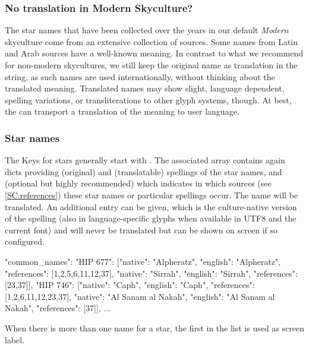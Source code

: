 \subsubsection{No translation in Modern Skyculture?}

The star names that have been collected over the years in our default \emph{Modern} skyculture come from an extensive collection of sources.
Some names from Latin and Arab sources have a well-known meaning.  
In contrast to what we recommend for non-modern skycultures, we still keep the original name as translation in the  string, 
as such names are used internationally, without thinking about the translated meaning. 
Translated names may show slight, language dependent, spelling variations, or transliterations to other glyph systems, though.
At best, the  can transport a translation of the meaning to user language. 

\subsubsection{Star names}


The Keys for stars generally start with . 
The associated array contains again dicts providing  (original) and 
 (translatable) spellings of the star names, 
and  (optional but highly recommended) which indicates 
in which sources (see \ref{SC:references}) these star names or particular spellings occur.
The  name will be translated. An additional  entry can be given, 
which is the culture-native version of the spelling 
(also in language-specific glyphs when available in UTF8 and the current font) and will never be translated but can be shown on screen if so configured.


\begin{jsonfile}[\tiny]
"common_names": {
    "HIP 677": [{"native": "Alpheratz",         "english": "Alpheratz",         "references": [1,2,5,6,11,12,37]},
                {"native": "Sirrah",            "english": "Sirrah",            "references": [23,37]}],
    "HIP 746": [{"native": "Caph",              "english": "Caph",              "references": [1,2,6,11,12,23,37]},
                {"native": "Al Sanam al Nakah", "english": "Al Sanam al Nakah", "references": [37]}],
	... }
\end{jsonfile}

When there is more than one name for a star, the first in the list is used as screen label. 


